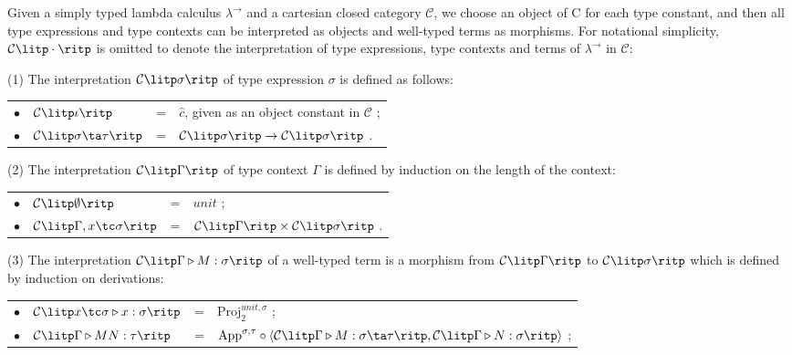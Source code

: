 \begin{definition}
\label{definition:inter_terms}
Given a simply typed lambda calculus $ \lambda ^ \to $ and a cartesian closed category $ \mathcal{C} $, we choose an object of C for each type constant, and then all type expressions and type contexts can be interpreted as objects and well-typed terms as morphisms. For notational simplicity, $ \mathcal{C} \litp \cdot \ritp $ is omitted to denote the interpretation of type expressions, type contexts and terms of $ \lambda ^ \to $ in $ \mathcal{C} $:
\begin{myitemize}
\item[(1)] The interpretation $ \mathcal{C} \litp \sigma \ritp $ of type expression $ \sigma $ is defined as follows: \\[5pt]
  \begin{tabular}{rlcl}
  $ \bullet $ & $ \mathcal{C} \litp \iota \ritp $ & = & $ \hat{c} $, given as an object constant in $ \mathcal{C} $ ; \\[5pt]
  $ \bullet $ & $ \mathcal{C} \litp \sigma \ta \tau \ritp $ & = & $ \mathcal{C} \litp \sigma \ritp \to \mathcal{C} \litp \sigma \ritp $ . \\[5pt]
  \end{tabular}
\item[(2)] The interpretation $ \mathcal{C} \litp \Gamma \ritp $ of type context $ \Gamma $ is defined by induction on the length of the context: \\[5pt]
  \begin{tabular}{rlcl}
  $ \bullet $ & $ \mathcal{C} \litp \emptyset \ritp $ & = & $ unit $ ; \\[5pt]
  $ \bullet $ & $ \mathcal{C} \litp \Gamma , x \tc \sigma \ritp $ & = & $ \mathcal{C} \litp \Gamma \ritp \times \mathcal{C} \litp \sigma \ritp $ . \\[5pt]
  \end{tabular}
\item[(3)] The interpretation $ \mathcal{C} \litp \Gamma \triangleright M: \sigma \ritp $ of a well-typed term is a morphism from $ \mathcal{C} \litp \Gamma \ritp $ to $ \mathcal{C} \litp \sigma \ritp $ which is defined by induction on derivations: \\[5pt]
  \begin{tabular}{rlcl}
  $ \bullet $ & $ \mathcal{C} \litp x \tc \sigma \triangleright x: \sigma \ritp $ & = & $ \text{Proj}_2^{unit, \sigma} $ ; \\[5pt]
  $ \bullet $ & $ \mathcal{C} \litp \Gamma \triangleright MN: \tau \ritp $ & = & $ \text{App}^{\sigma,\tau} \circ \langle \mathcal{C} \litp \Gamma \triangleright M: \sigma \ta \tau \ritp , \mathcal{C} \litp \Gamma \triangleright N: \sigma \ritp \rangle $ ; \\[5pt]

\end{tabular}
\end{myitemize}
\end{definition}
